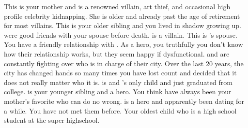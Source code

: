 \documentclass[char]{LRSguildcamp1}
\begin{document}
\begin{itemz}[Notes]
	\item 
\end{itemz}



\begin{contacts}
	\contact{\cGrandma{}} This is your mother and is a renowned villain, art thief, and occasional high profile celebrity kidnapping. She is older and already past the age of retirement for most villains.
	\contact{\cOldest{}} This is your older sibling and you lived in \cOldest{\their} shadow growing up. \cOldest{\they} were good friends with your spouse before \cAS{\their} death. \cOldest{} is a villain. 
	\contact{\cOS{}} This is \cOldest{}'s spouse. You have a friendly relationship with . As a hero, you truthfully you don't know how their relationship works, but they seem happy if dysfunctional.  \cOldest{} and \cOS{} are constantly fighting over who is in charge of their city.  Over the last 20 years, the city has changed hands so many times you have lost count and decided that it does not really matter who it is. 
	\contact{\cGrad{}} \cGrad{} is \cOldest{} and \cOS{}'s only child and just graduated from college. 
	\contact{\cYoungest{}} \cYoungest{} is your younger sibling and a hero. You think  have always been your mother's favorite who can do no wrong. 
	\contact{\cYS{}} \cYS{} is a hero and apparently been dating \cYoungest{} for a while. You have not met them before. 
	\contact{\cTeen{}} Your oldest child who is a high school student at the super highschool. 
	\contact{\cTween{}}
\end{contacts}
\end{document}
